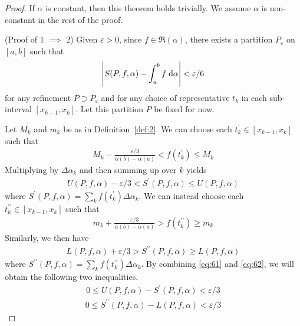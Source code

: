 \documentclass[thmcnt=section, 12pt]{my-elegantbook}
\begin{document}
\begin{proof}
    If $\alpha$ is constant, then this theorem holds trivially. We assume $\alpha$ is non-constant in the rest of the proof.

    (Proof of 1 $\implies$ 2) Given $\varepsilon > 0$, since $f \in \mathfrak{R}(\alpha)$, there exists a partition $P_\varepsilon$ on $[a, b]$ such that 
    \begin{align}
        \left\lvert S(P,f,\alpha) - \int_{a}^{b} f \; \mathrm{d}\alpha \right\rvert < \varepsilon / 6
        \label{eq:60}
    \end{align}
    for any refinement $P \supset P_\varepsilon$ and for any choice of representative $t_k$ in each sub-interval $[x_{k-1}, x_k]$. Let this partition $P$ be fixed for now. 

    Let $M_k$ and $m_k$ be as in Definition~\ref{def:2}. We can choose each $t_k^\prime \in [x_{k-1}, x_k]$ such that 
    \begin{align*}
        M_k - \frac{\varepsilon / 3}{\alpha(b) - \alpha(a)}
        < f(t_k^\prime)
        \leq M_k
    \end{align*}
    Multiplying by $\Delta \alpha_k$ and then summing up over $k$ yields
    \begin{align}
        U(P,f,\alpha) - \varepsilon / 3
        < S^\prime(P,f,\alpha)
        \leq U(P,f,\alpha)
        \label{eq:61}
    \end{align}
    where $S^\prime(P,f,\alpha) = \sum_{k} f(t_k^\prime) \Delta\alpha_k$. We can instead choose each $t_k^{\prime\prime} \in [x_{k-1}, x_k]$ such that 
    \begin{align*}
        m_k + \frac{\varepsilon / 3}{\alpha(b) - \alpha(a)}
        > f(t_k^{\prime\prime}) 
        \geq m_k 
    \end{align*}
    Similarly, we then have 
    \begin{align}
        L(P,f,\alpha) + \varepsilon / 3
        > S^{\prime\prime}(P,f,\alpha)
        \geq L(P,f,\alpha) 
        \label{eq:62}
    \end{align}
    where $S^{\prime\prime}(P,f,\alpha) = \sum_{k} f(t_k^{\prime\prime}) \Delta\alpha_k$. By combining \eqref{eq:61} and \eqref{eq:62}, we will obtain the following two inequalities. 
    \begin{align}
        0
        \leq U(P,f,\alpha) - S^{\prime}(P,f,\alpha) 
        < \varepsilon / 3
        \label{eq:63}
    \end{align}
    \begin{align}
        0
        \leq S^{\prime\prime}(P,f,\alpha) - L(P,f,\alpha)
        < \varepsilon / 3
        \label{eq:64}
    \end{align}


\end{proof}
\end{document}

